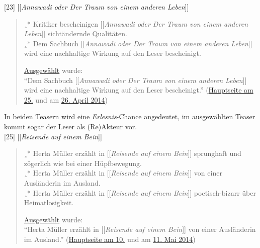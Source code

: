 \documentclass[fontsize=12pt]{scrartcl}
\begin{document}
[23] [[\textit{Annawadi oder Der Traum von einem anderen Leben}]]
\singlespacing
\begin{quote}
¸* Kritiker bescheinigen [[\textit{Annawadi oder Der Traum von einem anderen Leben}]] sicht\"andernde Qualit\"aten.\\
¸* Dem Sachbuch [[\textit{Annawadi oder Der Traum von einem anderen Leben}]] wird eine nachhaltige Wirkung auf den Leser bescheinigt.

\href{https://de.wikipedia.org/wiki/Wikipedia_Diskussion:Hauptseite/Schon_gewusst/Diskussionsarchiv/2014/M\%C3\%A4rz\#Eigenvorschlag:_Annawadi_oder_Der_Traum_von_einem_anderen_Leben__.2829._M.C3.A4rz_214.29_.28erl..29}{Ausgew\"ahlt} wurde:\\
"`Dem Sachbuch [[\textit{Annawadi oder Der Traum von einem anderen Leben}]] wird eine nachhaltige Wirkung auf den Leser bescheinigt."' (\href{https://de.wikipedia.org/wiki/Wikipedia:Hauptseite/Archiv/25._April_2014}{Hauptseite am 25.} und am \href{https://de.wikipedia.org/wiki/Wikipedia:Hauptseite/Archiv/26._April_2014}{26. April 2014})
\end{quote}
\onehalfspacing

In beiden Teasern wird eine \textit{Erlesnis}-Chance angedeutet, im ausgew\"ahlten Teaser kommt sogar der Leser\textsuperscript{\tiny *} als (Re)Akteur\textsuperscript{\tiny *} vor.\\

[25] [[\textit{Reisende auf einem Bein}]]
\singlespacing
\begin{quote}
¸* Herta M\"uller erz\"ahlt in [[\textit{Reisende auf einem Bein}]] sprunghaft und z\"ogerlich wie bei einer H\"upfbewegung.\\
¸* Herta M\"uller erz\"ahlt in [[\textit{Reisende auf einem Bein}]] von einer Aus\-l\"an\-de\-rin im Ausland.\\
¸* Herta M\"uller erz\"ahlt in [[\textit{Reisende auf einem Bein}]] poetisch-bizarr \"uber Heimatlosigkeit.

\href{https://de.wikipedia.org/wiki/Wikipedia_Diskussion:Hauptseite/Schon_gewusst/Diskussionsarchiv/2014/April#Eigenvorschlag:_Reisende_auf_einem_Bein_.287._April_2014.29_.28erl..29}{Ausgew\"ahlt} wurde:\\
"`Herta M\"uller erz\"ahlt in [[\textit{Reisende auf einem Bein}]] von einer Aus\-l\"an\-de\-rin im Ausland."' (\href{https://de.wikipedia.org/wiki/Wikipedia:Hauptseite/Archiv/10._Mai_2014}{Hauptseite am 10.} und am \href{https://de.wikipedia.org/wiki/Wikipedia:Hauptseite/Archiv/11._Mai_2014}{11. Mai 2014})
\end{quote}
\onehalfspacing
\end{document}

